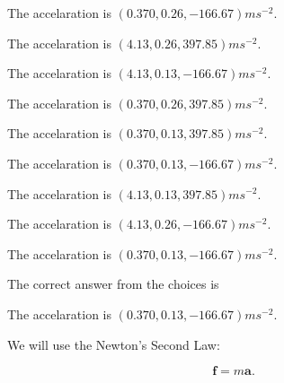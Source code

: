 \documentclass[12pt]{article}
\begin{document}
 
 
The accelaration is $  %
(
0.370,
0.26,
-166.67)
ms^{-2} $.
 
 
The accelaration is $  %
(
4.13,
0.26,
397.85)
ms^{-2} $.
 
 
The accelaration is $  %
(
4.13,
0.13,
-166.67)
ms^{-2} $.
 
 
The accelaration is $  %
(
0.370,
0.26,
397.85)
ms^{-2} $.
 
 
The accelaration is $  %
(
0.370,
0.13,
397.85)
ms^{-2} $.
 
 
The accelaration is $  %
(
0.370,
0.13,
-166.67)
ms^{-2} $.
 
 
The accelaration is $  %
(
4.13,
0.13,
397.85)
ms^{-2} $.
 
 
The accelaration is $  %
(
4.13,
0.26,
-166.67)
ms^{-2} $.
 
 
\noindent{}
 
 
The accelaration is $  %
(
0.370,
0.13,
-166.67)
ms^{-2} $.
 
 
\noindent{}
 
 
 
 
 
\noindent{}
 
 

The correct answer from the choices is


The accelaration is $  %
(
0.370,
0.13,
-166.67)
ms^{-2} $.
 
 
 
\noindent{}
 
 

 
 
 
\noindent{}
 
 

We will use the Newton's Second Law:
 
\[
\mathbf{f}=m\mathbf{a}.
\]
 
\end{document}
